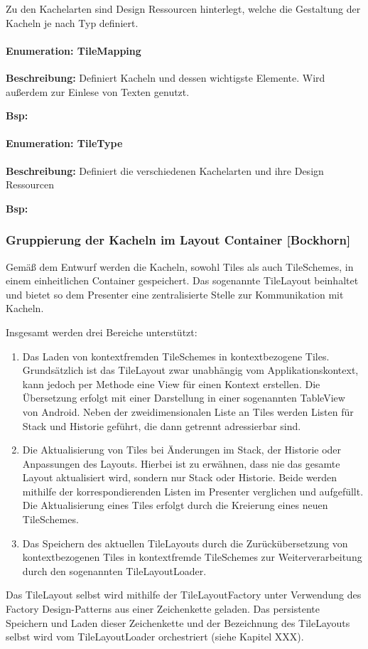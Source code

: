 Zu den Kachelarten sind Design Ressourcen hinterlegt, welche die Gestaltung der Kacheln je nach Typ definiert.

\paragraph{Enumeration: TileMapping}

\textbf{Beschreibung: }Definiert Kacheln und dessen wichtigste Elemente. Wird außerdem zur Einlese von Texten genutzt.

\textbf{Bsp:} 

\paragraph{Enumeration: TileType}

\textbf{Beschreibung: }Definiert die verschiedenen Kachelarten und ihre Design Ressourcen

\textbf{Bsp:} 

\subsubsection{Gruppierung der Kacheln im Layout Container [Bockhorn]}
Gemäß dem Entwurf werden die Kacheln, sowohl Tiles als auch TileSchemes, in einem einheitlichen Container gespeichert. Das sogenannte TileLayout beinhaltet und bietet so dem Presenter eine zentralisierte Stelle zur Kommunikation mit Kacheln.

Insgesamt werden drei Bereiche unterstützt:
\begin{enumerate}
	\item Das Laden von kontextfremden TileSchemes in kontextbezogene Tiles. Grundsätzlich ist das TileLayout zwar unabhängig vom Applikationskontext, kann jedoch per Methode eine View für einen Kontext erstellen. Die Übersetzung erfolgt mit einer Darstellung in einer sogenannten TableView von Android. Neben der zweidimensionalen Liste an Tiles werden Listen für Stack und Historie geführt, die dann getrennt adressierbar sind.
	\item Die Aktualisierung von Tiles bei Änderungen im Stack, der Historie oder Anpassungen des Layouts. Hierbei ist zu erwähnen, dass nie das gesamte Layout aktualisiert wird, sondern nur Stack oder Historie. Beide werden mithilfe der korrespondierenden Listen im Presenter verglichen und aufgefüllt. Die Aktualisierung eines Tiles erfolgt durch die Kreierung eines neuen TileSchemes.
	\item Das Speichern des aktuellen TileLayouts durch die Zurückübersetzung von kontextbezogenen Tiles in kontextfremde TileSchemes zur Weiterverarbeitung durch den sogenannten TileLayoutLoader.
\end{enumerate}
Das TileLayout selbst wird mithilfe der TileLayoutFactory unter Verwendung des Factory Design-Patterns aus einer Zeichenkette geladen. Das persistente Speichern und Laden dieser Zeichenkette und der Bezeichnung des TileLayouts selbst wird vom TileLayoutLoader orchestriert (siehe Kapitel XXX).


